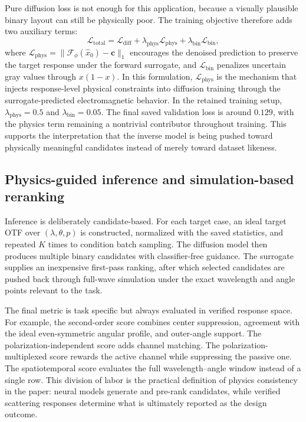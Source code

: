 Pure diffusion loss is not enough for this application, because a visually plausible binary layout can still be physically poor. The training objective therefore adds two auxiliary terms:
\begin{equation}
\mathcal{L}_{\mathrm{total}}
=\mathcal{L}_{\mathrm{diff}}
+\lambda_{\mathrm{phys}}\mathcal{L}_{\mathrm{phys}}
+\lambda_{\mathrm{bin}}\mathcal{L}_{\mathrm{bin}},
\end{equation}
where $\mathcal{L}_{\mathrm{phys}}=\|\mathcal{F}_{\phi}(\widehat{x}_0)-\mathbf{c}\|_1$ encourages the denoised prediction to preserve the target response under the forward surrogate, and $\mathcal{L}_{\mathrm{bin}}$ penalizes uncertain gray values through $x(1-x)$. In this formulation, $\mathcal{L}_{\mathrm{phys}}$ is the mechanism that injects response-level physical constraints into diffusion training through the surrogate-predicted electromagnetic behavior. In the retained training setup, $\lambda_{\mathrm{phys}}=0.5$ and $\lambda_{\mathrm{bin}}=0.05$. The final saved validation loss is around $0.129$, with the physics term remaining a nontrivial contributor throughout training. This supports the interpretation that the inverse model is being pushed toward physically meaningful candidates instead of merely toward dataset likeness.

\subsection{Physics-guided inference and simulation-based reranking}

Inference is deliberately candidate-based. For each target case, an ideal target OTF over $(\lambda,\theta,p)$ is constructed, normalized with the saved statistics, and repeated $K$ times to condition batch sampling. The diffusion model then produces multiple binary candidates with classifier-free guidance. The surrogate supplies an inexpensive first-pass ranking, after which selected candidates are pushed back through full-wave simulation under the exact wavelength and angle points relevant to the task.

The final metric is task specific but always evaluated in verified response space. For example, the second-order score combines center suppression, agreement with the ideal even-symmetric angular profile, and outer-angle support. The polarization-independent score adds channel matching. The polarization-multiplexed score rewards the active channel while suppressing the passive one. The spatiotemporal score evaluates the full wavelength--angle window instead of a single row. This division of labor is the practical definition of physics consistency in the paper: neural models generate and pre-rank candidates, while verified scattering responses determine what is ultimately reported as the design outcome.
